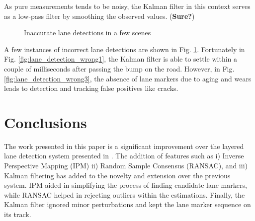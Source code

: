\documentclass{article}
\begin{document}
As pure measurements tends to be noisy, the Kalman filter in this context serves as a low-pass filter by smoothing the observed values. ({\bf Sure?})
\begin{figure}[htb!]
  \centering
  \hspace{0.00001in}
  \caption{Inaccurate lane detections in a few scenes}
  \label{fig:lane_detection_wrong}
\end{figure}

A few instances of incorrect lane detections are shown in Fig. \ref{fig:lane_detection_wrong}. Fortunately in Fig. \ref{fig:lane_detection_wrong1}, the Kalman filter is able to settle within a couple of milliseconds after passing the bump on the road. However, in Fig. \ref{fig:lane_detection_wrong3}, the absence of lane markers due to aging and wears leads to detection and tracking false positives like cracks.

\section{Conclusions}
\label{sec:concl}
The work presented in this paper is a significant improvement over the layered lane detection system presented in \cite{borkar_layered_2009}. The addition of features such as i) Inverse Perspective Mapping (IPM) ii) Random Sample Consensus (RANSAC), and iii) Kalman filtering has added to the novelty and extension over the previous system. IPM aided in simplifying the process of finding candidate lane markers, while RANSAC helped in rejecting outliers within the estimations. Finally, the Kalman filter ignored minor perturbations and kept the lane marker sequence on its track.
\end{document}
